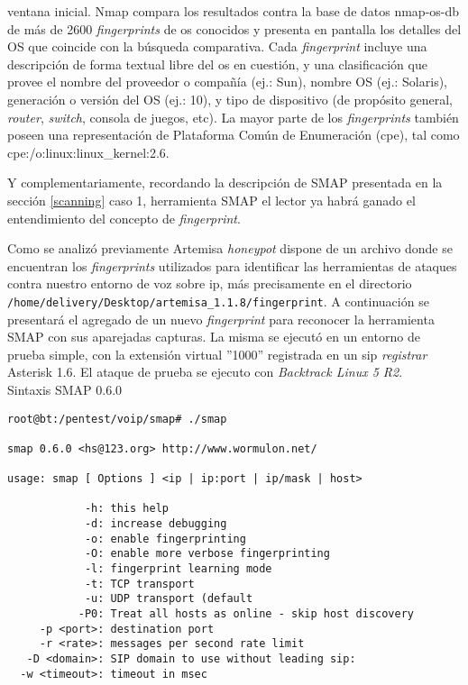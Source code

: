 \documentclass[a4paper,12pt]{report}
\newenvironment{myscriptlisting}
{\begin{list}{}{\setlength{\leftmargin}{1em}}\item\scriptsize\bfseries}
{\end{list}}
\begin{document}
ventana inicial. Nmap compara los resultados contra la base de datos nmap-os-db
de más de 2600 \emph{fingerprints} de \ac{os}
conocidos y presenta en pantalla los detalles del OS que coincide con  la
búsqueda comparativa. Cada \emph{fingerprint} incluye una descripción de forma textual
libre del \ac{os} en cuestión, y una clasificación que provee el
nombre del proveedor o compañía (ej.: Sun), nombre OS (ej.: Solaris), generación
o  versión del OS (ej.: 10), y tipo de dispositivo (de propósito general,
\emph{router}, \emph{switch}, consola de juegos, etc). La mayor parte de los \emph{fingerprints}
también poseen una representación de Plataforma Común de Enumeración
(\ac{cpe}), tal como
cpe:/o:linux:linux\_kernel:2.6. \cite{lyon}

Y complementariamente, recordando la descripción de SMAP presentada
en la sección \ref{scanning} caso 1, herramienta SMAP el lector ya habrá ganado el
entendimiento del concepto de \emph{fingerprint}.

Como se analizó previamente Artemisa \emph{honeypot} dispone de un archivo donde se
encuentran los \emph{fingerprints} utilizados para identificar las herramientas de
ataques contra nuestro entorno de voz sobre
\ac{ip}, más precisamente en el directorio \\
\texttt{/home/delivery/Desktop/artemisa\_1.1.8/fingerprint}. A
continuación se presentará el agregado de un nuevo \emph{fingerprint} para reconocer
la herramienta SMAP con sus aparejadas capturas. La misma se
ejecutó en un entorno de prueba simple, con la extensión virtual ''1000''
registrada en un \ac{sip} \emph{registrar} Asterisk 1.6. El ataque de prueba se ejecuto con
\emph{Backtrack Linux 5 R2}.\\

Sintaxis SMAP 0.6.0
\begin{myscriptlisting}   
  \begin{verbatim}
root@bt:/pentest/voip/smap# ./smap 

smap 0.6.0 <hs@123.org> http://www.wormulon.net/

usage: smap [ Options ] <ip | ip:port | ip/mask | host>

            -h: this help
            -d: increase debugging
            -o: enable fingerprinting
            -O: enable more verbose fingerprinting
            -l: fingerprint learning mode
            -t: TCP transport
            -u: UDP transport (default
           -P0: Treat all hosts as online - skip host discovery
     -p <port>: destination port
     -r <rate>: messages per second rate limit
   -D <domain>: SIP domain to use without leading sip:
  -w <timeout>: timeout in msec
  \end{verbatim}
\end{myscriptlisting}
\end{document}
